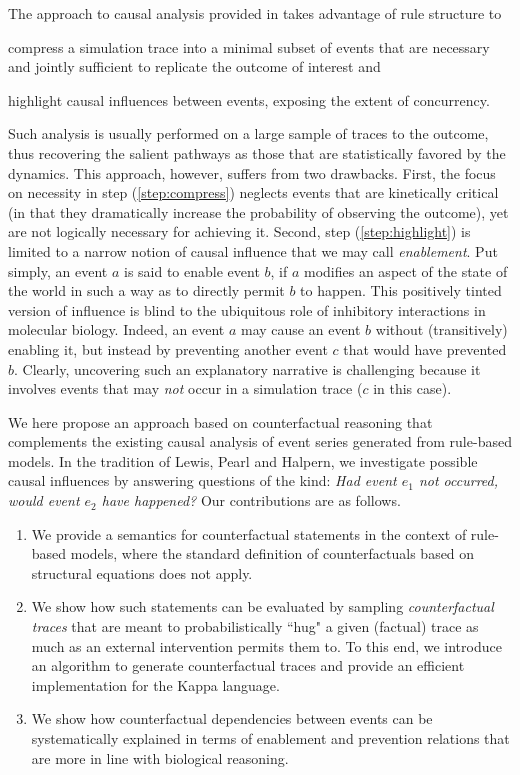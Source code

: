 The approach to causal analysis provided in
\cite{DBLP:conf/fsttcs/DanosFFHH12,DanosEtAl-CONCUR07} takes advantage
of rule structure to
\begin{inparaenum}[(i)]
\item \label{step:compress} compress a simulation trace into a minimal
  subset of events that are necessary and jointly sufficient to
  replicate the outcome of interest and
\item \label{step:highlight} highlight causal influences between
  events, exposing the extent of concurrency.
\end{inparaenum}
Such analysis is usually performed on a large sample of traces to the
outcome, thus recovering the salient pathways as those that are
statistically favored by the dynamics. This approach, however, suffers
from two drawbacks. First, the focus on necessity in step
(\ref{step:compress}) neglects events that are kinetically critical
(in that they dramatically increase the probability of observing the
outcome), yet are not logically necessary for achieving it. Second,
step (\ref{step:highlight}) is limited to a narrow notion of causal
influence that we may call \emph{enablement}. Put simply, an event $a$
is said to enable event $b$, if $a$ modifies an aspect of the state of
the world in such a way as to directly permit $b$ to happen. This
positively tinted version of influence is blind to the ubiquitous role
of inhibitory interactions in molecular biology.  Indeed, an event $a$
may cause an event $b$ without (transitively) enabling it, but instead
by preventing another event $c$ that would have prevented
$b$. Clearly, uncovering such an explanatory narrative is challenging
because it involves events that may \emph{not} occur in a simulation
trace ($c$ in this case).

We here propose an approach based on counterfactual reasoning that
complements the existing causal analysis of event series generated
from rule-based models. In the tradition of Lewis, Pearl and Halpern,
we investigate possible causal influences by answering questions of
the kind: \textit{Had event $e_1$ not occurred, would event $e_2$ have
  happened?}
Our contributions are as follows.
\begin{enumerate}
\item We provide a semantics for counterfactual statements in the
  context of rule-based models, where the standard definition of
  counterfactuals based on structural equations
  \cite{pearl2009causality,halpern2016actual} does not apply.
\item We show how such statements can be evaluated by sampling
  \emph{counterfactual traces} that are meant to probabilistically
  ``hug" a given (factual) trace as much as an external intervention
  permits them to. To this end, we introduce an algorithm to generate
  counterfactual traces and provide an efficient implementation for
  the Kappa language.
\item We show how counterfactual dependencies between events can be
  systematically explained in terms of enablement and prevention
  relations that are more in line with biological reasoning.
\end{enumerate}

